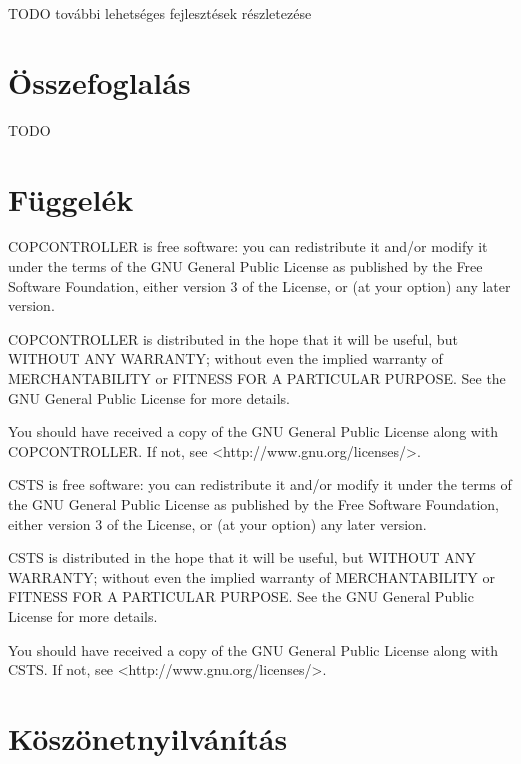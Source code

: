 \documentclass[a4paper,12pt]{report}
\begin{document}
TODO további lehetséges fejlesztések részletezése

\newpage
\chapter{Összefoglalás}
\label{summary}

TODO

\newpage
{}

\begin{singlespace}

\end{singlespace}

\chapter*{Függelék}

\noindent
COPCONTROLLER is free software: you can redistribute it and/or modify
it under the terms of the GNU General Public License as published by
the Free Software Foundation, either version 3 of the License, or
(at your option) any later version.

\noindent
COPCONTROLLER is distributed in the hope that it will be useful,
but WITHOUT ANY WARRANTY; without even the implied warranty of
MERCHANTABILITY or FITNESS FOR A PARTICULAR PURPOSE.  See the
GNU General Public License for more details.

\noindent
You should have received a copy of the GNU General Public License
along with COPCONTROLLER. If not, see <http://www.gnu.org/licenses/>.

\noindent
CSTS is free software: you can redistribute it and/or modify
it under the terms of the GNU General Public License as published by
the Free Software Foundation, either version 3 of the License, or
(at your option) any later version.

\noindent
CSTS is distributed in the hope that it will be useful,
but WITHOUT ANY WARRANTY; without even the implied warranty of
MERCHANTABILITY or FITNESS FOR A PARTICULAR PURPOSE.  See the
GNU General Public License for more details.

\noindent
You should have received a copy of the GNU General Public License
along with CSTS. If not, see <http://www.gnu.org/licenses/>.



\chapter*{Köszönetnyilvánítás}
\end{document}
